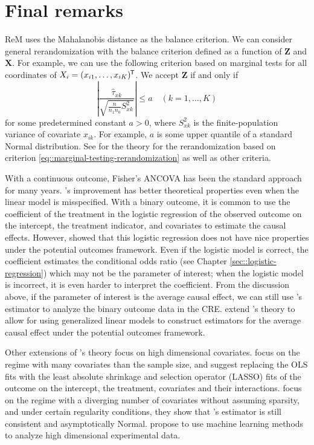  


\section{Final remarks}

ReM uses the Mahalanobis distance as the balance criterion. We can consider general rerandomization with the balance criterion defined as a function of $\bm{Z}$ and $\bm{X}$.  For example, we can use the following criterion based on marginal tests for all coordinates of $X_i = (x_{i1}, \ldots, x_{iK})^{\mkern-1.5mu\mathsf{T}}$. We accept $\bm{Z}$ if and only if 
\begin{equation}
\label{eq::marginal-testing-rerandomization}
\left | \frac{  \hat{\tau}_{xk} }{   \sqrt{  \frac{n}{n_1 n_0} S_{xk}^2       }  }   \right | \leq  a \quad ( k=1,\ldots, K )
\end{equation}
for some predetermined constant $a > 0$, where $S_{xk}^2$ is the finite-population variance of covariate $x_{ik}$.  For example, $a$ is some upper quantile of a standard Normal distribution. See \citet{zhao2021no} for the theory for the rerandomization based on criterion \eqref{eq::marginal-testing-rerandomization} as well as other criteria. 


With a continuous outcome, Fisher's ANCOVA has been the standard approach for many years.  \citet{lin2013}'s improvement has better theoretical properties even when the linear model is misspecified. With a binary outcome, it is common to use the coefficient of the treatment in the logistic regression of the observed outcome on the intercept, the treatment indicator, and covariates to estimate the causal effects. However, \citet{freedman2008randomization} showed that this logistic regression does not have nice properties under the potential outcomes framework. Even if the logistic model is correct, the coefficient estimates the conditional odds ratio (see Chapter \ref{sec::logistic-regression}) which may not be the parameter of interest; when the logistic model is incorrect, it is even harder to interpret the coefficient. From the discussion above, if the parameter of interest is the average causal effect, we can still use \citet{lin2013}'s estimator to analyze the binary outcome data in the CRE. \cite{guo2020generalized} extend  \citet{lin2013}'s theory to allow for using generalized linear models to construct estimators for the average causal effect under the potential outcomes framework.  


Other extensions of \citet{lin2013}'s theory focus on high dimensional covariates. \citet{bloniarz2015lasso} focus on the regime with many covariates than the sample size, and suggest replacing the OLS fits with the least absolute shrinkage and selection operator (LASSO) fits \citep{tibshirani1996regression} of the outcome on the intercept, the treatment, covariates and their interactions. \citet{lei2018regression} focus on the regime with a diverging number of covariates without assuming sparsity, and under certain regularity conditions, they show that \citet{lin2013}'s estimator is still consistent and asymptotically Normal. \citet{wager2016high} propose to use machine learning methods to analyze high dimensional experimental data. 



